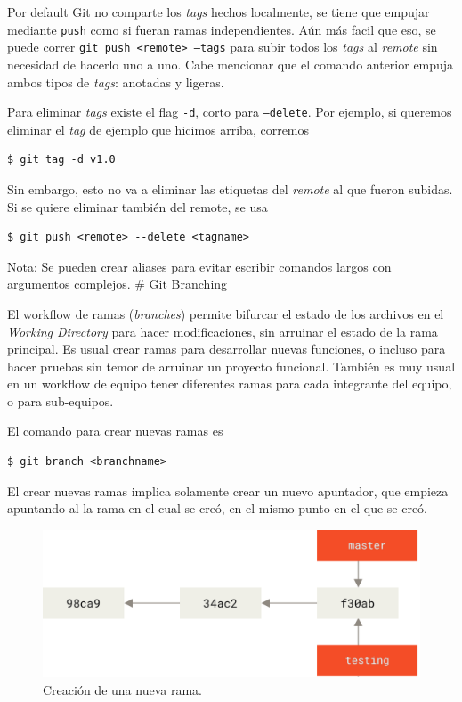\documentclass[spanish, 12pt, a4paper]{article}
\begin{document}
Por default Git no comparte los \emph{tags} hechos localmente, se tiene
que empujar mediante \passthrough{\lstinline!push!} como si fueran ramas
independientes. Aún más facil que eso, se puede correr
\passthrough{\lstinline!git push <remote> –tags!} para subir todos los
\emph{tags} al \emph{remote} sin necesidad de hacerlo uno a uno. Cabe
mencionar que el comando anterior empuja ambos tipos de \emph{tags}:
anotadas y ligeras.

Para eliminar \emph{tags} existe el flag \passthrough{\lstinline!-d!},
corto para \passthrough{\lstinline!–delete!}. Por ejemplo, si queremos
eliminar el \emph{tag} de ejemplo que hicimos arriba, corremos

\begin{lstlisting}
$ git tag -d v1.0
\end{lstlisting}

Sin embargo, esto no va a eliminar las etiquetas del \emph{remote} al
que fueron subidas. Si se quiere eliminar también del remote, se usa

\begin{lstlisting}
$ git push <remote> --delete <tagname>
\end{lstlisting}

Nota: Se pueden crear aliases para evitar escribir comandos largos con
argumentos complejos. \# Git Branching

El workflow de ramas (\emph{branches}) permite bifurcar el estado de los
archivos en el \emph{Working Directory} para hacer modificaciones, sin
arruinar el estado de la rama principal. Es usual crear ramas para
desarrollar nuevas funciones, o incluso para hacer pruebas sin temor de
arruinar un proyecto funcional. También es muy usual en un workflow de
equipo tener diferentes ramas para cada integrante del equipo, o para
sub-equipos.

El comando para crear nuevas ramas es

\begin{lstlisting}
$ git branch <branchname>
\end{lstlisting}

El crear nuevas ramas implica solamente crear un nuevo apuntador, que
empieza apuntando al la rama en el cual se creó, en el mismo punto en el
que se creó.

\begin{figure}
\centering
\includegraphics{figs/two-branches.png}
\caption{Creación de una nueva rama.{}}
\end{figure}
\end{document}
